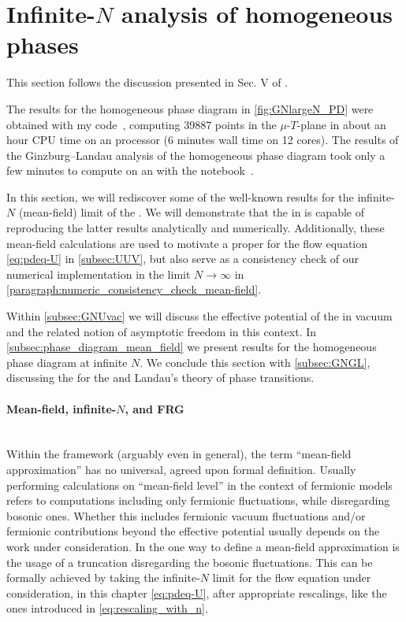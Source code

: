 \section{Infinite-\texorpdfstring{$N$}{N} analysis of homogeneous phases}\label{sec:gnInfHomo}
\begin{disclaimer}
	This section follows the discussion presented in Sec. V of .
	
	The results for the homogeneous phase diagram in \cref{fig:GNlargeN_PD} were obtained with my \Cpp{} code~\cite{Steil:2023GNcpp}, computing 39887 points in the $\mu$-$T$-plane in about an hour CPU time on an \ryzen{} processor (6 minutes wall time on 12 cores).
	The results of the Ginzburg–Landau analysis of the homogeneous phase diagram took only a few minutes to compute on an \intel{} with the \WAM{} notebook~\cite{Steil:2023GNnotebook}.
\end{disclaimer}
In this section, we will rediscover some of the well-known results for the infinite-$N$ (mean-field) limit of the \gnyBm{}.
We will demonstrate that the \frg{} in \lpa{} is capable of reproducing the latter results analytically and numerically.
Additionally, these mean-field calculations are used to motivate a proper \uv{} \ic{} for the flow equation \eqref{eq:pdeq-U} in \cref{subsec:UUV}, but also serve as a consistency check of our numerical implementation in the limit $N \rightarrow \infty$ in \cref{paragraph:numeric_consistency_check_mean-field}.

Within \cref{subsec:GNUvac} we will discuss the effective potential of the \gnyBm{} in vacuum and the related notion of asymptotic freedom in this context.
In \cref{subsec:phase_diagram_mean_field} we present results for the homogeneous phase diagram at infinite $N$.
We conclude this section with \cref{subsec:GNGL}, discussing the \gla{} for the \gnyBm{} and Landau’s theory of phase transitions.

\paragraph{Mean-field, infinite-\texorpdfstring{$N$}{N}, and FRG}\label{paragraph:mean-field_infinite_n_frg}\mbox{}\\%
Within the \frg{} framework (arguably even in general), the term ``mean-field approximation'' has no universal, agreed upon formal definition.
Usually performing calculations on ``mean-field level'' in the context of fermionic models refers to computations including only fermionic fluctuations, while disregarding bosonic ones.
Whether this includes fermionic vacuum fluctuations and/or fermionic contributions beyond the effective potential usually depends on the work under consideration.
In the \frg{} one way to define a mean-field approximation is the usage of a \lpa{} truncation disregarding the bosonic fluctuations.
This can be formally achieved by taking the infinite-$N$ limit for the \lpa{} flow equation under consideration, in this chapter \cref{eq:pdeq-U}, after appropriate rescalings, like the ones introduced in \cref{eq:rescaling_with_n}.
	
